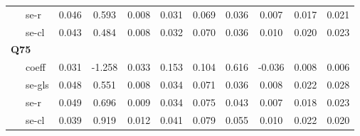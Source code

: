 \begin{table}
\begin{tabular}{lccccccccc}
    \ \ \ se-r     &  0.046  & 0.593  & 0.008 & 0.031 & 0.069  & 0.036  & 0.007  & 0.017  & 0.021  \\
    \ \ \ se-cl    &  0.043  & 0.484  & 0.008 & 0.032 & 0.070  & 0.036  & 0.010  & 0.020  & 0.023  \\
    \hline
    \multicolumn{8}{l}{\textbf{Q75}} \\
    \ \ \ coeff     &  0.031  & -1.258 & 0.033 & 0.153 & 0.104  & 0.616  & -0.036 & 0.008  & 0.006  \\
    \ \ \ se-gls   &  0.048  & 0.551  & 0.008 & 0.034 & 0.071  & 0.036  & 0.008  & 0.022  & 0.028  \\
    \ \ \ se-r     &  0.049  & 0.696  & 0.009 & 0.034 & 0.075  & 0.043  & 0.007  & 0.018  & 0.023  \\
    \ \ \ se-cl    &  0.039  & 0.919  & 0.012 & 0.041 & 0.079  & 0.055  & 0.010  & 0.022  & 0.020  \\
    \bottomrule
    \end{tabular}
\end{table}